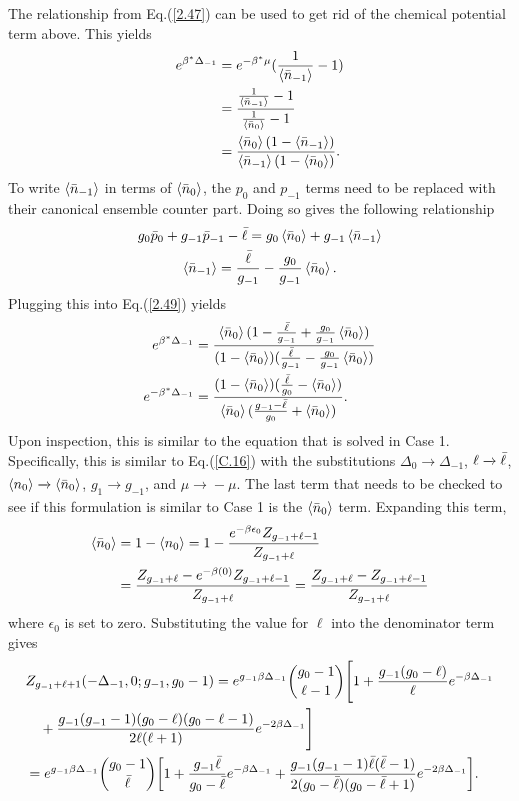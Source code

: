 The relationship from Eq.\@ (\ref{2.47}) can be used to get rid of the chemical potential term above. This yields
\begin{align}
    e^{\beta^*\Delta_{-1}}&=e^{-\beta^*\mu}(\frac{1}{\left<{\Bar{n}_{-1}}\right>}-1)\nonumber\\
    &=\frac{\frac{1}{\left<{\Bar{n}_{-1}}\right>}-1}{\frac{1}{\left<{\Bar{n}_0}\right>}-1}\nonumber\\
    &=\frac{\left<{\Bar{n}_0}\right>(1-\left<{\Bar{n}_{-1}}\right>)}{\left<{\Bar{n}_{-1}}\right>(1-\left<{\Bar{n}_0}\right>)}.
\end{align}
To write $\left<{\Bar{n}_{-1}}\right>$ in terms of $\left<{\Bar{n}_0}\right>$, the $p_0$ and $p_{-1}$ terms  need to be replaced with their canonical ensemble counter part. Doing so gives the following relationship
\begin{gather}
    g_0\Bar{p}_0+g_{-1}\Bar{p}_{-1}-\Bar{\ell}=g_0\left<{\Bar{n}_0}\right>+g_{-1}\left<{\Bar{n}_{-1}}\right>\\
    \left<{\Bar{n}_{-1}}\right>=\frac{\Bar{\ell}}{g_{-1}}-\frac{g_0}{g_{-1}}\left<{\Bar{n}_0}\right>.
\end{gather}
Plugging this into Eq.\@ (\ref{2.49}) yields
\begin{align}
    e^{\beta^*\Delta_{-1}}&=\frac{\left<{\Bar{n}_0}\right>(1-\frac{\Bar{\ell}}{g_{-1}}+\frac{g_0}{g_{-1}}\left<{\Bar{n}_0}\right>)}{(1-\left<{\Bar{n}_0}\right>)(\frac{\Bar{\ell}}{g_{-1}}-\frac{g_0}{g_{-1}}\left<{\Bar{n}_0}\right>)}\\
    e^{-\beta^*\Delta_{-1}}&=\frac{(1-\left<{\Bar{n}_0}\right>)(\frac{\Bar{\ell}}{g_0}-\left<{\Bar{n}_0}\right>)}{\left<{\Bar{n}_0}\right>(\frac{g_{-1}-\Bar{\ell}}{g_0}+\left<{\Bar{n}_0}\right>)}.
\end{align}
Upon inspection, this is similar to the equation that is solved in Case 1. Specifically, this is similar to Eq.\@ (\ref{C.16}) with the substitutions $\Delta_0\xrightarrow[]{}\Delta_{-1}$, $\ell\xrightarrow[]{}\Bar{\ell}$, $\left<{n_0}\right>\xrightarrow[]{}\left<{\Bar{n}_0}\right>$, $g_1\xrightarrow[]{}g_{-1}$, and $\mu \xrightarrow[]{}-\mu$. The last term that needs to be checked to see if this formulation is similar to Case 1 is the $\left<{\Bar{n}_0}\right>$ term. Expanding this term, 
\begin{align}
    \left<{\Bar{n}_0}\right>&=1-\left<{n_0}\right>=1-\frac{e^{-\beta\epsilon_0}Z_{g_{-1}+\ell-1}}{Z_{g_{-1}+\ell}}\\
    &=\frac{Z_{g_{-1}+\ell}-e^{-\beta (0)}Z_{g_{-1}+\ell-1}}{Z_{g_{-1}+\ell}}=\frac{Z_{g_{-1}+\ell}-Z_{g_{-1}+\ell-1}}{Z_{g_{-1}+\ell}} \label{2.56}
\end{align}
where $\epsilon_0$ is set to zero. Substituting the value for $\ell$ into the denominator term gives
\begin{align}
    &Z_{g_{-1}+\ell+1}(-\Delta_{-1},0;g_{-1},g_0-1)=e^{g_{-1}\beta\Delta_{-1}}{g_0-1 \choose \ell-1}\Biggr[1+\frac{g_{-1}(g_0-\ell)}{\ell}e^{-\beta\Delta_{-1}}\nonumber\\
    &\quad+\frac{g_{-1}(g_{-1}-1)(g_0-\ell)(g_0-\ell-1)}{2\ell(\ell+1)}e^{-2\beta\Delta_{-1}}\Biggr]\nonumber\\
    &=e^{g_{-1}\beta\Delta_{-1}}{g_0-1 \choose \Bar{\ell}}\qty[1+\frac{g_{-1}\Bar{\ell}}{g_0-\bar{\ell}}e^{-\beta\Delta_{-1}}+\frac{g_{-1}(g_{-1}-1)\Bar{\ell}(\Bar{\ell}-1)}{2(g_0-\Bar{\ell})(g_0-\Bar{\ell}+1)}e^{-2\beta\Delta_{-1}}].
\end{align}
